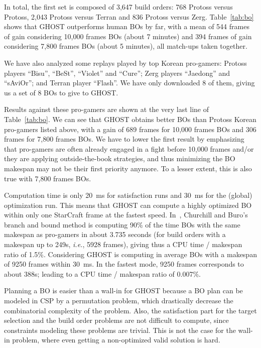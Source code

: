 \documentclass[journal]{IEEEtran}
\newcommand{\csp}{\textsc{CSP}\xspace}
\newcommand{\ghost}{\textsc{GHOST}\xspace}
\newcommand{\ie}{\textit{i.e.}}
\begin{document}
In total, the first set is  composed of 3,647 build orders: 768 Protoss
versus  Protoss, 2,043  Protoss versus  Terran and  836 Protoss  versus
Zerg.   
Table~\ref{tab:bo}  shows that \ghost
outperforms human BOs by far, with  a mean of 544 frames of gain considering 10,000 frames BOs (about 7 minutes) and 394 frames of
gain considering 7,800 frames BOs (about 5 minutes), all match-ups taken together.

We have also analyzed some replays played by top Korean
pro-gamers: Protoss players ``Bisu'', ``BeSt'', ``Violet'' and ``Cure''; Zerg players ``Jaedong'' and ``sAviOr''; and Terran player
``Flash''. We have only downloaded 8 of them, giving us a set of 8 BOs to give to \ghost.

Results against  these pro-gamers are shown  at the very last  line of
Table~\ref{tab:bo}.  We can see that \ghost obtains better BOs
than  Protoss Korean  pro-gamers listed  above, with  a gain  of 689 frames for  10,000 frames BOs  and 306 frames for 7,800  frames BOs.  We  have to  lower the  first result  by
emphasizing that pro-gamers are often  already engaged in a fight before
10,000 frames and/or they are applying outside-the-book strategies, and thus
minimizing the BO makespan may not be their first priority anymore. To
a lesser extent, this is also true with 7,800 frames BOs.

Computation time is  only 20~ms for satisfaction runs and  30~ms for the
(global) optimization run. This means that \ghost can compute a highly
optimized BO  within only one StarCraft frame  at the fastest
speed. In~\cite{ChurchillB11},  Churchill and Buro's branch  and bound
method  is computing  90\%  of the  time BOs  with the  same
makespan as pro-gamers in about 3.735 seconds (for build orders with a
makespan  up to  249s, \ie, 5928 frames), giving  thus a  CPU time  / makespan  ratio of
1.5\%. Considering \ghost is computing  in average BOs with a
makespan of  9250 frames within  30~ms. In  the fastest
mode, 9250 frames corresponds to about 388s; leading to
a CPU time / makespan ratio of 0.007\%.

Planning a BO is easier than a wall-in for \ghost because a BO plan can be modeled in \csp by a
permutation  problem,  which  drastically decrease  the  combinatorial
complexity of the problem.
Also,  the satisfaction part for the target
selection and the  build order problems are not  difficult to compute,
since constraints  modeling these problems  are trivial.  This  is not
the case for  the wall-in problem, where even  getting a non-optimized
valid solution is hard.
\end{document}
